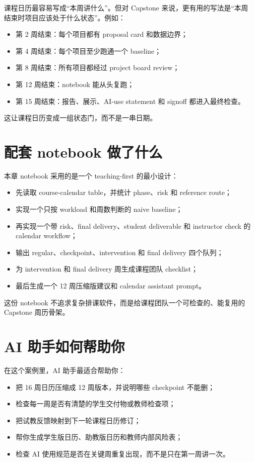 课程日历最容易写成“本周讲什么”。但对 Capstone 来说，更有用的写法是“本周结束时项目应该处于什么状态”。例如：

\begin{itemize}
    \item 第 2 周结束：每个项目都有 proposal card 和数据边界；
    \item 第 4 周结束：每个项目至少跑通一个 baseline；
    \item 第 8 周结束：所有项目都经过 project board review；
    \item 第 12 周结束：notebook 能从头复跑；
    \item 第 15 周结束：报告、展示、AI-use statement 和 signoff 都进入最终检查。
\end{itemize}

这让课程日历变成一组状态门，而不是一串日期。

\section{配套 notebook 做了什么}

本章 notebook 采用的是一个 teaching-first 的最小设计：

\begin{itemize}
    \item 先读取 course-calendar table，并统计 phase、risk 和 reference route；
    \item 实现一个只按 workload 和周数判断的 naive baseline；
    \item 再实现一个带 risk、final delivery、student deliverable 和 instructor check 的 calendar workflow；
    \item 输出 regular、checkpoint、intervention 和 final delivery 四个队列；
    \item 为 intervention 和 final delivery 周生成课程团队 checklist；
    \item 最后生成一个 12 周压缩版建议和 calendar assistant prompt。
\end{itemize}

这份 notebook 不追求复杂排课软件，而是给课程团队一个可检查的、能复用的 Capstone 周历骨架。

\section{AI 助手如何帮助你}

在这个案例里，AI 助手最适合帮助你：

\begin{itemize}
    \item 把 16 周日历压缩成 12 周版本，并说明哪些 checkpoint 不能删；
    \item 检查每一周是否有清楚的学生交付物或教师检查项；
    \item 把试教反馈映射到下一轮课程日历修订；
    \item 帮你生成学生版日历、助教版日历和教师内部风险表；
    \item 检查 AI 使用规范是否在关键周重复出现，而不是只在第一周讲一次。
\end{itemize}

